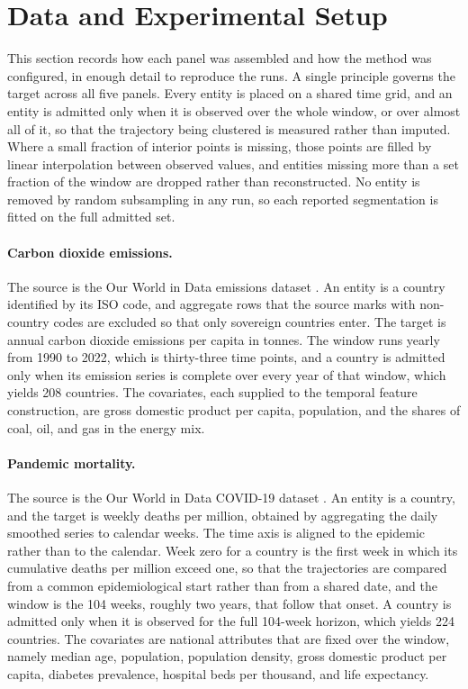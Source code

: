 \section{Data and Experimental Setup}
\label{sec:data}

This section records how each panel was assembled and how the method was configured, in enough detail to reproduce the runs. A single principle governs the target across all five panels. Every entity is placed on a shared time grid, and an entity is admitted only when it is observed over the whole window, or over almost all of it, so that the trajectory being clustered is measured rather than imputed. Where a small fraction of interior points is missing, those points are filled by linear interpolation between observed values, and entities missing more than a set fraction of the window are dropped rather than reconstructed. No entity is removed by random subsampling in any run, so each reported segmentation is fitted on the full admitted set.

\paragraph{Carbon dioxide emissions.} The source is the Our World in Data emissions dataset \citep{owidco2}. An entity is a country identified by its ISO code, and aggregate rows that the source marks with non-country codes are excluded so that only sovereign countries enter. The target is annual carbon dioxide emissions per capita in tonnes. The window runs yearly from 1990 to 2022, which is thirty-three time points, and a country is admitted only when its emission series is complete over every year of that window, which yields 208 countries. The covariates, each supplied to the temporal feature construction, are gross domestic product per capita, population, and the shares of coal, oil, and gas in the energy mix.

\paragraph{Pandemic mortality.} The source is the Our World in Data COVID-19 dataset \citep{owidcovid}. An entity is a country, and the target is weekly deaths per million, obtained by aggregating the daily smoothed series to calendar weeks. The time axis is aligned to the epidemic rather than to the calendar. Week zero for a country is the first week in which its cumulative deaths per million exceed one, so that the trajectories are compared from a common epidemiological start rather than from a shared date, and the window is the 104 weeks, roughly two years, that follow that onset. A country is admitted only when it is observed for the full 104-week horizon, which yields 224 countries. The covariates are national attributes that are fixed over the window, namely median age, population, population density, gross domestic product per capita, diabetes prevalence, hospital beds per thousand, and life expectancy.

